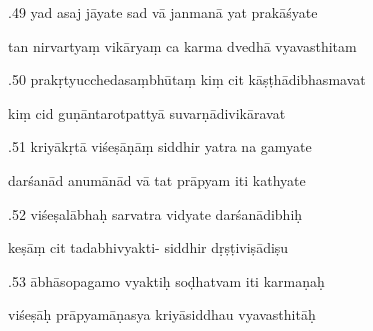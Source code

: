 \documentclass[article,12pt,a4paper]{memoir}%
\newcounter{parCount}
\begin{document}
	  
	  \pstart {}.49 yad asaj jāyate sad vā janmanā yat prakāśyate 
	{}
	\pend%
      

	  
	  \pstart \leavevmode%
	tan nirvartyaṃ vikāryaṃ ca karma dvedhā vyavasthitam 
	{}
	\pend%
      

	  
	  \pstart {}.50 prakṛtyucchedasaṃbhūtaṃ kiṃ cit kāṣṭhādibhasmavat 
	{}
	\pend%
      

	  
	  \pstart \leavevmode%
	kiṃ cid guṇāntarotpattyā suvarṇādivikāravat 
	{}
	\pend%
      

	  
	  \pstart {}.51 kriyākṛtā viśeṣāṇāṃ siddhir yatra na gamyate 
	{}
	\pend%
      

	  
	  \pstart \leavevmode%
	darśanād anumānād vā tat prāpyam iti kathyate 
	{}
	\pend%
      

	  
	  \pstart {}.52 viśeṣalābhaḥ sarvatra vidyate darśanādibhiḥ 
	{}
	\pend%
      

	  
	  \pstart \leavevmode%
	keṣāṃ cit tadabhivyakti- siddhir dṛṣṭiviṣādiṣu 
	{}
	\pend%
      

	  
	  \pstart {}.53 ābhāsopagamo vyaktiḥ soḍhatvam iti karmaṇaḥ 
	{}
	\pend%
      

	  
	  \pstart \leavevmode%
	viśeṣāḥ prāpyamāṇasya kriyāsiddhau vyavasthitāḥ 
	{}
	\pend%
      
\end{document}
